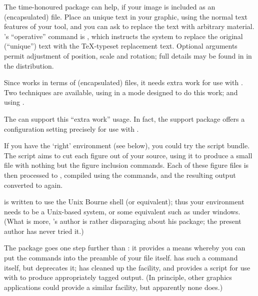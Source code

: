 The time-honoured  package can help, if your image is
included as an (encapsulated) \PS{} file.  Place an unique
text in your graphic, using the normal text features of your tool, and
you can ask  to replace the text with arbitrary
\AllTeX{} material.  's ``operative'' command is
, which
instructs the system to replace the original (``unique'') text with
the \TeX{}-typeset replacement text.  Optional arguments permit
adjustment of position, scale and rotation; full details may be found
in  in the distribution.

Since  works in terms of (encapsulated) \PS{} files,
it needs extra work for use with \PDFLaTeX{}.  Two techniques are
available, using 
in a mode designed to do this work; and using .

The  can support
this ``extra work'' usage.  In fact, the  support
package  offers a configuration setting
precisely for use with .

If you have the `right' environment (see below), you could try the
 script bundle.  The script aims to cut each figure
out of your source, using it to produce a small \latex{} file with
nothing but the figure inclusion commands.  Each of these figure files
is then processed to \PS{}, compiled using the  commands,
and the resulting output converted to  again.

 is written to use the Unix Bourne shell (or
equivalent); thus your environment needs to be a Unix-based system, or
some equivalent such as  under windows.  (What is
more, 's author is rather disparaging about his
package; the present author has never tried it.)

The  package goes one step further than
: it provides a means whereby you can put the
 commands into the preamble of your  file
itself.   has such a command itself, but deprecates
it;  has cleaned up the facility, and provides a
script  for use with  to produce
appropriately tagged output.  (In principle, other graphics
applications could provide a similar facility, but apparently none does.)

